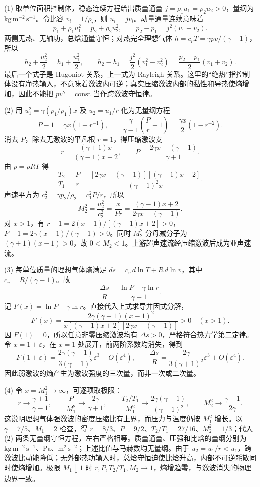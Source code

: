 (1) 取单位面积控制体，稳态连续方程给出质量通量 \(j=\rho_1u_1=\rho_2u_2>0\)，量纲为 \(\mathrm{kg\,m^{-2}\,s^{-1}}\)。令比容 \(v_i=1/\rho_i\)，则 \(u_i=jv_i\)。动量通量连续意味着
\[
 p_1+\rho_1u_1^2=p_2+\rho_2u_2^2,\qquad
 p_2-p_1=j^2(v_1-v_2).
\]
两侧无热、无轴功，总焓通量守恒；对热完全理想气体 \(h=c_pT=\gamma pv/(\gamma-1)\)，所以
\[
 h_2+\frac{u_2^2}{2}=h_1+\frac{u_1^2}{2},\qquad
 h_2-h_1=\frac{j^2}{2}(v_1^2-v_2^2)
 =\frac{p_2-p_1}{2}(v_1+v_2).
\]
最后一个式子是 Hugoniot 关系，上一式为 Rayleigh 关系。这里的“绝热”指控制体没有净热输入，不意味着激波内可逆；真实压缩激波内部的黏性和导热使熵增加，因此不能把 \(pv^\gamma=\mathrm{const}\) 当作跨激波守恒律。

(2) 用 \(u_1^2=\gamma(p_1/\rho_1)x\) 及 \(u_2=u_1/r\) 化为无量纲方程
\[
 P-1=\gamma x(1-r^{-1}),\qquad
 \frac{\gamma}{\gamma-1}\left(\frac{P}{r}-1\right)
 =\frac{\gamma x}{2}(1-r^{-2}).
\]
消去 \(P\)，除去无激波的平凡根 \(r=1\)，得压缩激波支
\[
 \boxed{r=\frac{(\gamma+1)x}{(\gamma-1)x+2}},\qquad
 \boxed{P=\frac{2\gamma x-(\gamma-1)}{\gamma+1}}.
\]
由 \(p=\rho RT\) 得
\[
 \boxed{\frac{T_2}{T_1}=\frac{P}{r}
 =\frac{[2\gamma x-(\gamma-1)][(\gamma-1)x+2]}{(\gamma+1)^2x}}.
\]
声速平方为 \(c_2^2=\gamma p_2/\rho_2=c_1^2P/r\)，所以
\[
 \boxed{M_2^2=\frac{u_2^2}{c_2^2}=\frac{x}{Pr}
 =\frac{(\gamma-1)x+2}{2\gamma x-(\gamma-1)}}.
\]
对 \(x>1\)，有 \(r-1=2(x-1)/[(\gamma-1)x+2]>0\)，\(P-1=2\gamma(x-1)/(\gamma+1)>0\)。同时 \(M_2^2\) 分母减分子为 \((\gamma+1)(x-1)>0\)，故 \(0<M_2<1\)。上游超声速流经压缩激波后成为亚声速流。

(3) 每单位质量的理想气体熵满足 \(ds=c_v\,d\ln T+R\,d\ln v\)，其中 \(c_v=R/(\gamma-1)\)。故
\[
 \boxed{\frac{\Delta s}{R}=\frac{\ln P-\gamma\ln r}{\gamma-1}}.
\]
记 \(F(x)=\ln P-\gamma\ln r\)。直接代入上式求导并因式分解，
\[
 F'(x)=\frac{2\gamma(\gamma-1)(x-1)^2}
 {x[(\gamma-1)x+2][2\gamma x-(\gamma-1)]}>0\quad(x>1).
\]
因 \(F(1)=0\)，所以任意非零压缩激波均有 \(\Delta s>0\)，严格符合热力学第二定律。令 \(x=1+\varepsilon\)，在 \(x=1\) 处展开，前两阶系数均消失，得到
\[
 F(1+\varepsilon)=\frac{2\gamma(\gamma-1)}{3(\gamma+1)^2}\varepsilon^3+O(\varepsilon^4),\qquad
 \boxed{\frac{\Delta s}{R}=\frac{2\gamma}{3(\gamma+1)^2}\varepsilon^3+O(\varepsilon^4)}.
\]
因此弱激波的熵产生为激波强度的三次量，而非一次或二次量。

(4) 令 \(x=M_1^2\to\infty\)，可逐项取极限：
\[
 \boxed{r\to\frac{\gamma+1}{\gamma-1}},\qquad
 \boxed{\frac{P}{M_1^2}\to\frac{2\gamma}{\gamma+1}},\qquad
 \boxed{\frac{T_2/T_1}{M_1^2}\to\frac{2\gamma(\gamma-1)}{(\gamma+1)^2}},\qquad
 \boxed{M_2^2\to\frac{\gamma-1}{2\gamma}}.
\]
这说明理想气体强激波的密度压缩比有上界，而压力与温度仍按 \(M_1^2\) 增长。以 \(\gamma=7/5\)、\(M_1=2\) 检查，得 \(r=8/3\)、\(P=9/2\)、\(T_2/T_1=27/16\)、\(M_2^2=1/3\)；代入 (2) 两条无量纲守恒方程，左右严格相等。质量通量、压强和比焓的量纲分别为 \(\mathrm{kg\,m^{-2}\,s^{-1}}\)、\(\mathrm{Pa}\)、\(\mathrm{m^2\,s^{-2}}\)；上述比值与马赫数均无量纲。由于 \(u_2=u_1/r<u_1\)，跨激波比动能降低；无外部热功输入时，总焓守恒迫使比焓升高，内部不可逆耗散同时使熵增加。极限 \(M_1\downarrow1\) 时 \(r,P,T_2/T_1,M_2\to1\)，熵增趋零，与激波消失的物理边界一致。
